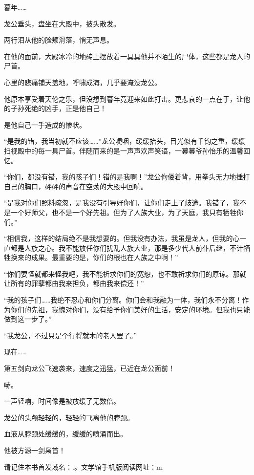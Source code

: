 \begin{this_body}
暮年……

龙公垂头，盘坐在大殿中，披头散发。

两行泪从他的脸颊滑落，悄无声息。

在他的面前，大殿冰冷的地砖上摆放着一具具他并不陌生的尸体，这些都是龙人的尸首。

心里的悲痛铺天盖地，呼啸成海，几乎要淹没龙公。

他原本享受着天伦之乐，但没想到暮年竟迎来如此打击。更悲哀的一点在于，让他的子孙死绝的凶手，正是他自己！

是他自己一手造成的惨状。

“是我的错，我当初就不应该……”龙公哽咽，缓缓抬头，目光似有千钧之重，缓缓扫视殿中的每一具尸首。伴随而来的是一声声欢声笑语，一幕幕爷孙怡乐的温馨回忆。

“你们，都没有错，我的孩子们！错的是我啊！”龙公佝偻着背，用拳头无力地捶打自己的胸口，砰砰的声音在空荡的大殿中回响。

“是我对你们照料疏忽，是我没有引导好你们，让你们走上了歧途。我错了，我不是一个好师父，也不是一个好先祖。但为了人族大业，为了天庭，我只有牺牲你们。”

“相信我，这样的结局绝不是我想要的。但我没有办法，我虽是龙人，但我的心一直都是人族之心。我不能放任你们扰乱人族大业，那是多少代人前仆后继，不计牺牲换来的成果。最重要的是，你们的根也在人族之中啊！”

“你们要怪就都来怪我吧，我不能祈求你们的宽恕，也不敢祈求你们的原谅。那就让所有的罪孽都由我来担负，都由我来偿还！”

“我的孩子们……我绝不忍心和你们分离。你们会和我融为一体，我们永不分离！作为你们的先祖，我愧对你们，没有给予你们美好的生活，安定的环境。但我也只能做到这一步了。”

“我龙公，不过只是个行将就木的老人罢了。”

现在……

第五剑向龙公飞速袭来，速度之迅猛，已近在龙公面前！

哧。

一声轻响，时间像是被放缓了无数倍。

龙公的头颅轻轻的，轻轻的飞离他的脖颈。

血液从脖颈处缓缓的，缓缓的喷涌而出。

他被方源一剑枭首！

请记住本书首发域名：.。文学馆手机版阅读网址：m.

\end{this_body}

